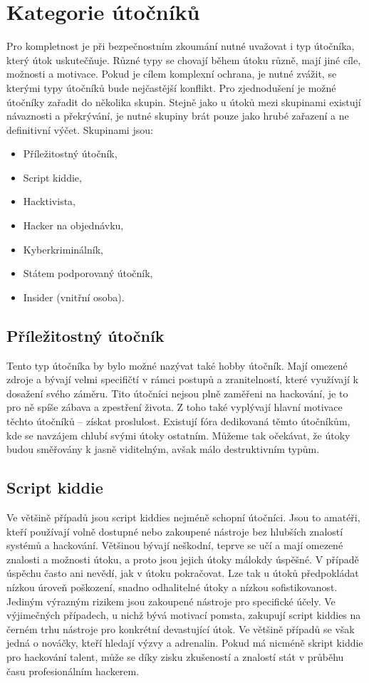 \section{Kategorie útočníků}\label{sec:kategorie-utocniku}
Pro kompletnost je při bezpečnostním zkoumání nutné uvažovat i typ útočníka, který útok uskutečňuje.
Různé typy se chovají během útoku různě, mají jiné cíle, možnosti a motivace.
Pokud je cílem komplexní ochrana, je nutné zvážit, se kterými typy útočníků bude nejčastější konflikt.
Pro zjednodušení je možné útočníky zařadit do několika skupin.
Stejně jako u útoků mezi skupinami existují návaznosti a překrývání, je nutné skupiny brát pouze jako hrubé zařazení a ne definitivní výčet.
Skupinami jsou:
\begin{itemize}
	\item Příležitostný útočník,
	\item Script kiddie,
	\item Hacktivista,
	\item Hacker na objednávku,
	\item Kyberkriminálník,
	\item Státem podporovaný útočník,
	\item Insider (vnitřní osoba).
\end{itemize}\cite{Enisa_thread_landscape,data_flair_attackers}

\subsection{Příležitostný útočník}\label{subsec:prilezitostny-utocnik}
Tento typ útočníka by bylo možné nazývat také hobby útočník.
Mají omezené zdroje a bývají velmi specifičtí v rámci postupů a zranitelností, které využívají k dosažení svého záměru.
Tito útočníci nejsou plně zaměřeni na hackování, je to pro ně spíše zábava a zpestření života.
Z toho také vyplývají hlavní motivace těchto útočníků -- získat proslulost.
Existují fóra dedikovaná těmto útočníkům, kde se navzájem chlubí svými útoky ostatním.
Můžeme tak očekávat, že útoky budou směřovány k jasně viditelným, avšak málo destruktivním typům.

\subsection{Script kiddie}\label{subsec:script-kiddie}
Ve většině případů jsou script kiddies nejméně schopní útočníci.
Jsou to amatéři, kteří používají volně dostupné nebo zakoupené nástroje bez hlubších znalostí systémů a hackování.
Většinou bývají neškodní, teprve se učí a mají omezené znalosti a možnosti útoku, a proto jsou jejich útoky málokdy úspěšné.
V případě úspěchu často ani nevědí, jak v útoku pokračovat.
Lze tak u útoků předpokládat nízkou úroveň poškození, snadno odhalitelné útoky a nízkou sofistikovanost.
Jediným výrazným rizikem jsou zakoupené nástroje pro specifické účely.
Ve výjimečných případech, u nichž bývá motivací pomsta, zakupují script kiddies na černém trhu nástroje pro konkrétní devastující útok.
Ve většině případů se však jedná o nováčky, kteří hledají výzvy a adrenalin.
Pokud má nicméně skript kiddie pro hackování talent, může se díky zisku zkušeností a znalostí stát v průběhu času profesionálním hackerem.

